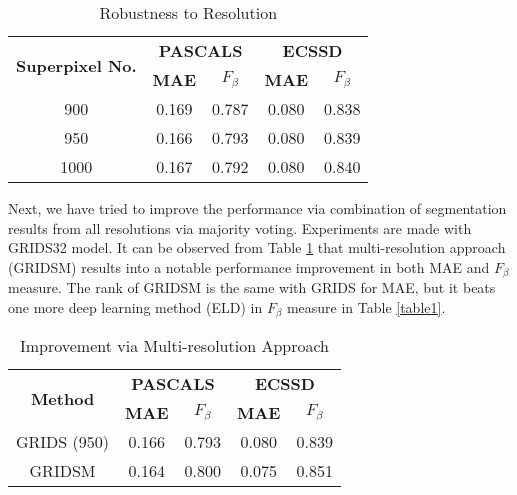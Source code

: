 \documentclass[a4paper,conference]{IEEEtran}
\begin{document}
\begin{table}[!t]
\renewcommand{\arraystretch}{1.3}
\caption{Robustness to Resolution}
\label{table3}
\centering
\begin{tabular}{|c||c||c||c||c|}
\hline
    \multirow{2}{2cm}{\textbf{Superpixel No.}} & \multicolumn{2}{c|}{\textbf{PASCALS}} & \multicolumn{2}{c|}{\textbf{ECSSD}}   \\
    \cline{2-5}
     &\textbf{MAE} & \textbf{$F_\beta$} & \textbf{MAE} & \textbf{$F_\beta$}   \\
    \hline

    900 & 0.169 & 0.787 & 0.080 & 0.838   \\ \hline
    950 & 0.166 & 0.793 & 0.080 & 0.839 \\ \hline
    1000 & 0.167 & 0.792 & 0.080 & 0.840  \\ \hline

\end{tabular}
\end{table}

Next, we have tried to improve the performance via combination of segmentation results from all resolutions via majority voting.
Experiments are made with GRIDS32 model.
It can be observed from Table \ref{table3} that multi-resolution approach (GRIDSM) results into a notable performance improvement in both MAE and $F_\beta$ measure.
The rank of GRIDSM is the same with GRIDS for MAE, but it beats one more deep learning method (ELD) in $F_\beta$ measure in Table \ref{table1}.


\begin{table}[!t]
\renewcommand{\arraystretch}{1.3}
\caption{Improvement via Multi-resolution Approach}
\label{table4}
\centering
\begin{tabular}{|c||c||c||c||c|}
\hline
    \multirow{2}{2cm}{\textbf{Method}} & \multicolumn{2}{c|}{\textbf{PASCALS}} & \multicolumn{2}{c|}{\textbf{ECSSD}}   \\
    \cline{2-5}
     &\textbf{MAE} & \textbf{$F_\beta$} & \textbf{MAE} & \textbf{$F_\beta$}   \\
    \hline

    GRIDS (950) & 0.166 & 0.793 & 0.080 & 0.839    \\ \hline
    GRIDSM & 0.164 & 0.800 & 0.075 & 0.851 \\ \hline

\end{tabular}
\end{table}
\end{document}
